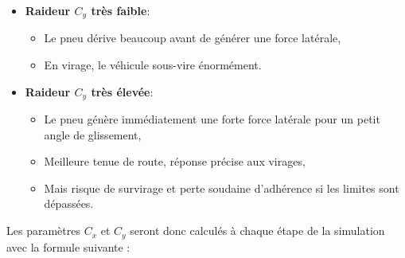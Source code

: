 \begin{itemize}
\item \textbf{Raideur $C_y$ très faible}:
\begin{itemize}[label=$\star$]
\item Le pneu dérive beaucoup avant de générer une force latérale,
\item En virage, le véhicule sous-vire énormément.
\end{itemize}

\item \textbf{Raideur $C_y$ très élevée}:
\begin{itemize}[label=$\star$]
\item Le pneu génère immédiatement une forte force latérale pour un petit angle de glissement,
\item Meilleure tenue de route, réponse précise aux virages,
\item Mais risque de survirage et perte soudaine d’adhérence si les limites sont dépassées.
\end{itemize}
\end{itemize}

Les paramètres $C_x$ et $C_y$ seront donc calculés à chaque étape de la simulation avec la formule suivante :

